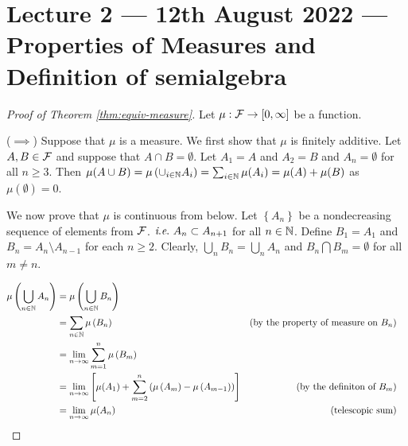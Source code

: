 \section{Lecture 2 --- 12th August 2022 --- Properties of Measures and Definition of semialgebra}

\begin{proof}[Proof of Theorem \ref{thm:equiv-measure}] 
    Let $\mu : {\cal F} \to [0,\infty]$ be a function.

    ($\implies$) Suppose that $\mu$ is a measure. We first show that $\mu$ is finitely additive. Let $A, B \in {\cal F}$ and suppose that $A\cap B=\emptyset$. Let $A_1 =A $ and $A_2 =B$ and $A_n = \emptyset$ for all $n\ge 3$. Then $\mu (A\cup B) = \mu \left( \cup_{i\in\mathbb N} A_i \right) = \sum_{i\in\mathbb N} \mu (A_i) = \mu (A) + \mu (B)$ as $\mu (\emptyset ) =0$. 

    We now prove that $\mu$ is continuous from below. Let $\left\{ A_n \right\}$ be a nondecreasing sequence of elements from ${\cal F}$. $\textit{i}.\textit{e}. \ A_n \subset A_{n+1}$ for all $n \in \mathbb N$. Define $B_1=A_1$ and $B_n = A_n \setminus A_{n-1}$ for each $n\ge 2$. Clearly, $\bigcup_n B_n = \bigcup_n A_n$ and $B_n \bigcap B_m = \emptyset$ for all $m\ne n$.

    \begin{align*}
        \mu \left( \bigcup_{n \in \mathbb N} A_n \right) &= \mu \left( \bigcup_{n \in \mathbb N} B_n \right) &\\
        &= \sum_{n\in \mathbb N} \mu \left( B_n \right) & \text{(by the property of measure on } B_n ) &\\
        &= \lim_{n \to \infty} \sum_{m=1}^{n} \mu \left( B_m \right) &\\
        &= \lim_{n \to \infty} \left[\mu (A_1) +\sum_{m=2}^{n} \left(\mu \left( A_m \right) - \mu \left( A_{m-1} \right) \right) \right] & \text{(by the definiton of } B_m ) \\
        &= \lim_{n \to \infty} \mu (A_n) & \text{(telescopic sum)}
    \end{align*}


\end{proof}
